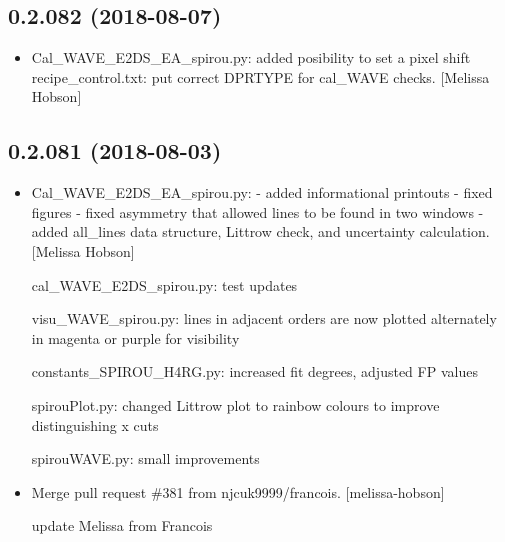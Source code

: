 \documentclass[a4paper,10pt,english]{report}
\begin{document}
\subsection{0.2.082 (2018-08-07)}
\label{\detokenize{misc/changelog:id379}}\begin{itemize}
\item {} 
Cal\_WAVE\_E2DS\_EA\_spirou.py: added posibility to set a pixel shift
recipe\_control.txt: put correct DPRTYPE for cal\_WAVE checks. {[}Melissa
Hobson{]}

\end{itemize}


\subsection{0.2.081 (2018-08-03)}
\label{\detokenize{misc/changelog:id380}}\begin{itemize}
\item {} 
Cal\_WAVE\_E2DS\_EA\_spirou.py: - added informational printouts - fixed
figures - fixed asymmetry that allowed lines to be found in two
windows - added all\_lines data structure, Littrow check, and
uncertainty calculation. {[}Melissa Hobson{]}

cal\_WAVE\_E2DS\_spirou.py: test updates

visu\_WAVE\_spirou.py: lines in adjacent orders are now plotted alternately in magenta or purple for visibility

constants\_SPIROU\_H4RG.py: increased fit degrees, adjusted FP values

spirouPlot.py: changed Littrow plot to rainbow colours to improve distinguishing x cuts

spirouWAVE.py: small improvements

\item {} 
Merge pull request \#381 from njcuk9999/francois. {[}melissa-hobson{]}

update Melissa from Francois

\end{itemize}
\end{document}

